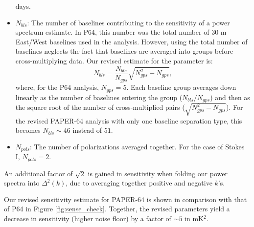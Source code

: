 \documentclass[preprint2,numberedappendix,tighten]{aastex6}  %
\begin{document}
\begin{itemize}
days.
\item $N_{bls}$: The number of baselines contributing to the sensitivity of a power spectrum estimate. In P64, this number was 
the total number of $30$ m East/West baselines used in the analysis. However, using the total number of baselines neglects 
the fact that baselines are averaged into groups before cross-multiplying data. Our revised estimate for the parameter is:
\begin{equation}
N_{bls} = \frac{N_{bls}}{N_{gps}}\sqrt{N_{gps}^{2}-N_{gps}},
\end{equation}
\noindent where, for the P64 analysis, $N_{gps} = 5$. Each baseline group averages down linearly as the number of baselines 
entering the group ($N_{bls}/N_{gps}$) and then as the square root of the number of cross-multiplied pairs ($\sqrt{N_{gps}^{2} - 
N_{gps}}$). For the revised PAPER-64 analysis with only one baseline separation type, this becomes $N_{bls} \sim 46$ instead 
of $51$. 
\item $N_{pols}$: The number of polarizations averaged together. For the case of Stokes I, $N_{pols}=2$.
\end{itemize}

An additional factor of $\sqrt{2}$ is gained in sensitivity when folding our power spectra into $\Delta^{2}(k)$, due to averaging 
together positive and negative $k$'s. 

Our revised sensitivity estimate for PAPER-64 is shown in comparison with that of P64 in Figure \ref{fig:sense_check}. 
Together, the revised parameters yield a decrease in sensitivity (higher noise floor) by a factor of $\sim5$ in mK$^{2}$. 
\end{document}
